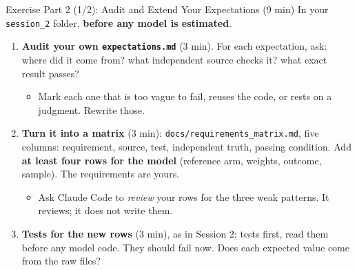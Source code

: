 \documentclass[aspectratio=169, 11pt]{beamer}
\begin{document}
\begin{frame}{Exercise Part 2 (1/2): Audit and Extend Your Expectations (9 min)}
  In your \texttt{session\_2} folder, \textbf{before any model is estimated}.

  \vspace{0.3em}
  \begin{enumerate}
    \small
    \item \textbf{Audit your own \texttt{expectations.md}} (3 min). For each expectation, ask: where did it come from? what independent source checks it? what exact result passes?
    \begin{itemize}
      \footnotesize
      \item Mark each one that is too vague to fail, reuses the code, or rests on a judgment. Rewrite those.
    \end{itemize}

    \vspace{0.2em}
    \item \textbf{Turn it into a matrix} (3 min): \texttt{docs/requirements\_matrix.md}, five columns: requirement, source, test, independent truth, passing condition. Add \textbf{at least four rows for the model} (reference arm, weights, outcome, sample). The requirements are yours.
    \begin{itemize}
      \footnotesize
      \item Ask Claude Code to \emph{review} your rows for the three weak patterns. It reviews; it does not write them.
    \end{itemize}

    \vspace{0.2em}
    \item \textbf{Tests for the new rows} (3 min), as in Session 2: tests first, read them before any model code. They should \alert{fail} now. Does each expected value come from the raw files?
  \end{enumerate}
\end{frame}
\end{document}
